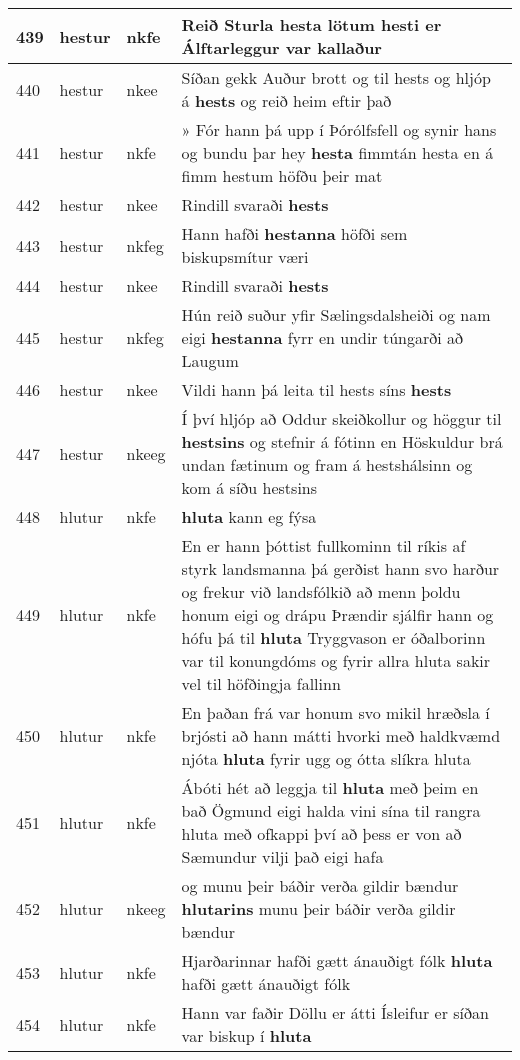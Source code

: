 \documentclass{article}
\begin{document}
\begin{longtable}{p{1cm}|p{1cm}|p{1cm}|p{13cm}}
\hline
439&hestur&nkfe&Reið Sturla \textbf{hesta} lötum hesti er Álftarleggur var kallaður\\
\hline
440&hestur&nkee&Síðan gekk Auður brott og til hests og hljóp á \textbf{hests} og reið heim eftir það\\
\hline
441&hestur&nkfe&» Fór hann þá upp í Þórólfsfell og synir hans og bundu þar hey \textbf{hesta} fimmtán hesta en á fimm hestum höfðu þeir mat\\
\hline
442&hestur&nkee&Rindill svaraði \textbf{hests} \\
\hline
443&hestur&nkfeg&Hann hafði \textbf{hestanna} höfði sem biskupsmítur væri\\
\hline
444&hestur&nkee&Rindill svaraði \textbf{hests} \\
\hline
445&hestur&nkfeg&Hún reið suður yfir Sælingsdalsheiði og nam eigi \textbf{hestanna} fyrr en undir túngarði að Laugum\\
\hline
446&hestur&nkee&Vildi hann þá leita til hests síns \textbf{hests} \\
\hline
447&hestur&nkeeg&Í því hljóp að Oddur skeiðkollur og höggur til \textbf{hestsins} og stefnir á fótinn en Höskuldur brá undan fætinum og fram á hestshálsinn og kom á síðu hestsins\\
\hline
448&hlutur&nkfe& \textbf{hluta} kann eg fýsa\\
\hline
449&hlutur&nkfe&En er hann þóttist fullkominn til ríkis af styrk landsmanna þá gerðist hann svo harður og frekur við landsfólkið að menn þoldu honum eigi og drápu Þrændir sjálfir hann og hófu þá til \textbf{hluta} Tryggvason er óðalborinn var til konungdóms og fyrir allra hluta sakir vel til höfðingja fallinn\\
\hline
450&hlutur&nkfe&En þaðan frá var honum svo mikil hræðsla í brjósti að hann mátti hvorki með haldkvæmd njóta \textbf{hluta} fyrir ugg og ótta slíkra hluta\\
\hline
451&hlutur&nkfe&Ábóti hét að leggja til \textbf{hluta} með þeim en bað Ögmund eigi halda vini sína til rangra hluta með ofkappi því að þess er von að Sæmundur vilji það eigi hafa\\
\hline
452&hlutur&nkeeg&og munu þeir báðir verða gildir bændur \textbf{hlutarins} munu þeir báðir verða gildir bændur\\
\hline
453&hlutur&nkfe&Hjarðarinnar hafði gætt ánauðigt fólk \textbf{hluta} hafði gætt ánauðigt fólk\\
\hline
454&hlutur&nkfe&Hann var faðir Döllu er átti Ísleifur er síðan var biskup í \textbf{hluta} \\

\end{longtable}
\end{document}
